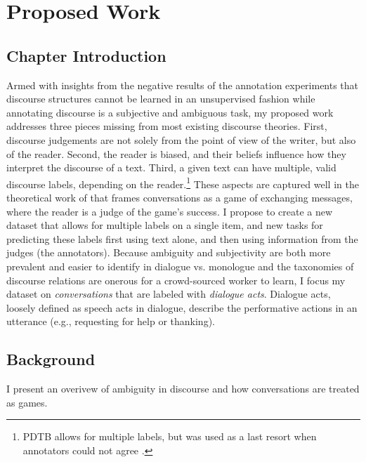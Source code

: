 \chapter{Proposed Work}
\label{ch:proposed}


\section{Chapter Introduction}
Armed with insights from the negative results of the annotation experiments that discourse structures cannot be learned in an unsupervised fashion while annotating discourse is a subjective and ambiguous task, my proposed work addresses three pieces missing from most existing discourse theories. First, discourse judgements are not solely from the point of view of the writer, but also of the reader. Second, the reader is biased, and their beliefs influence how they interpret the discourse of a text. Third, a given text can have multiple, valid discourse labels, depending on the reader.\footnote{PDTB allows for multiple labels, but was used as a last resort when annotators could not agree \citep{Versley:2011}.} These aspects are captured well in the theoretical work of \citet{Asher:2018} that frames conversations as a game of exchanging messages, where the reader is a judge of the game's success. I propose to create a new dataset that allows for multiple labels on a single item, and new tasks for predicting these labels first using text alone, and then using information from the judges (the annotators). Because ambiguity and subjectivity are both more prevalent and easier to identify in dialogue vs. monologue and the taxonomies of discourse relations are onerous for a crowd-sourced worker to learn, I focus my dataset on \emph{conversations} that are labeled with \emph{dialogue acts}. Dialogue acts, loosely defined as speech acts in dialogue, describe the performative actions in an utterance (e.g., requesting for help or thanking).

\section{Background}
I present an overivew of ambiguity in discourse and how conversations are treated as games.

